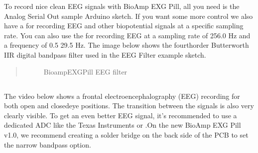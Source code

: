 \documentclass[a4paper,10pt,english,oneside]{sphinxmanual}
\let\sphinxpxdimen\pdfpxdimen\else\newdimen\sphinxpxdimen
\begin{document}
\begin{DUlineblock}{0em}
\item[] 
\end{DUlineblock}

\sphinxAtStartPar
To record nice clean EEG signals with BioAmp EXG Pill, all you need is the Analog Serial Out sample Arduino sketch. If you want some more control we also have a  for recording EEG and other biopotential signals at a specific sampling rate. You can also use the  for recording EEG at a sampling rate of 256.0 Hz and a frequency of 0.5 \sphinxhyphen{} 29.5 Hz. The image below shows the fourth\sphinxhyphen{}order Butterworth IIR digital bandpass filter used in the EEG Filter example sketch.
\begin{quote}

\begin{figure}[htbp]
\centering
\capstart

\noindent\sphinxincludegraphics[width=600\sphinxpxdimen]{{bioamp-exg-pill-eegfilter}.jpg}
\caption{Bioamp\sphinxhyphen{}EXG\sphinxhyphen{}Pill EEG filter}\label{\detokenize{applications/index:id16}}\end{figure}
\end{quote}

\begin{DUlineblock}{0em}
\item[] 
\end{DUlineblock}


\subsection{}
\label{\detokenize{applications/index:frontal-eeg-recording}}
\sphinxAtStartPar
The video below shows a frontal electroencephalography (EEG) recording for both open\sphinxhyphen{} and closed\sphinxhyphen{}eye positions. The transition between the signals is also very clearly visible. To get an even better EEG signal, it’s recommended to use a dedicated ADC like the Texas Instruments  or   .On the new BioAmp EXG Pill v1.0, we recommend creating a solder bridge on the back side of the PCB to set the narrow bandpass option.
\end{document}
